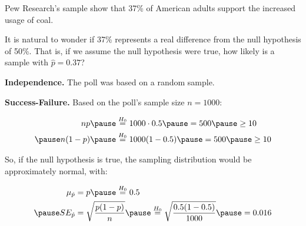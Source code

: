 \documentclass{beamer}
\begin{document}
\begin{frame}
  \begin{examplecont}
    Pew Research's sample show that 37\% of American adults support the increased usage of coal.\pause

    \vspace{1mm}
    It is natural to wonder if 37\% represents a real difference from the null hypothesis of 50\%. That is, if we assume the null hypothesis were true, how likely is a sample with $\hat{p}=0.37$?\pause

    \vspace{1mm}
    \textbf{Independence.} The poll was based on a random sample.\pause

    \vspace{1mm}
    \textbf{Success-Failure.} Based on the poll's sample size $n=1000$:

    \vspace{-3mm}
    \begin{equation*}
      \begin{aligned}
        np\pause &\overset{H_0}{=} 1000\cdot 0.5\pause = 500\pause \geq 10\\\pause
        n(1-p)\pause &\overset{H_0}{=} 1000(1-0.5)\pause = 500\pause \geq 10
      \end{aligned}
    \end{equation*}

    \vspace{-1mm}
    So, if the null hypothesis is true, the sampling distribution would be approximately normal, with:

    \vspace{-3mm}
    \begin{equation*}
      \begin{aligned}
        \mu_{\hat{p}} &= p\pause \overset{H_0}{=} 0.5 \\\pause
        SE_{\hat{p}} &= \sqrt{\dfrac{p(1-p)}{n}}\pause \overset{H_0}{=} \sqrt{\dfrac{0.5(1-0.5)}{1000}}\pause = 0.016
      \end{aligned}
    \end{equation*}
  \end{examplecont}
\end{frame}
\end{document}
